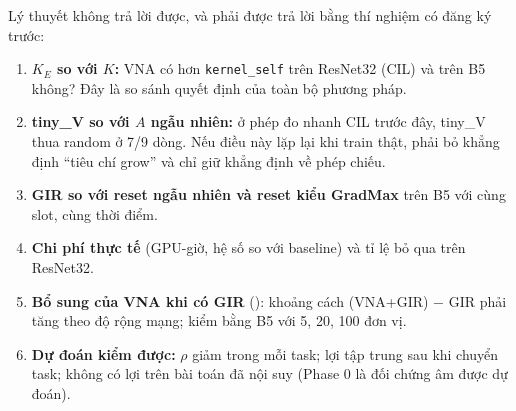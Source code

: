 Lý thuyết không trả lời được, và phải được trả lời bằng thí nghiệm có đăng ký trước:
\begin{enumerate}
\item \textbf{$K_E$ so với $K$:} VNA có hơn \texttt{kernel\_self} trên ResNet32 (CIL) và trên B5 không? Đây là so sánh quyết định của toàn bộ phương pháp.
\item \textbf{tiny\_V so với $A$ ngẫu nhiên:} ở phép đo nhanh CIL trước đây, tiny\_V thua random ở 7/9 dòng. Nếu điều này lặp lại khi train thật, phải bỏ khẳng định ``tiêu chí grow'' và chỉ giữ khẳng định về phép chiếu.
\item \textbf{GIR so với reset ngẫu nhiên và reset kiểu GradMax} trên B5 với cùng slot, cùng thời điểm.
\item \textbf{Chi phí thực tế} (GPU-giờ, hệ số so với baseline) và tỉ lệ bỏ qua trên ResNet32.
\item \textbf{Bổ sung của VNA khi có GIR} (): khoảng cách (VNA+GIR) $-$ GIR phải tăng theo độ rộng mạng; kiểm bằng B5 với 5, 20, 100 đơn vị.
\item \textbf{Dự đoán kiểm được:} $\rho$ giảm trong mỗi task; lợi tập trung sau khi chuyển task; không có lợi trên bài toán đã nội suy (Phase 0 là đối chứng âm được dự đoán).
\end{enumerate}
